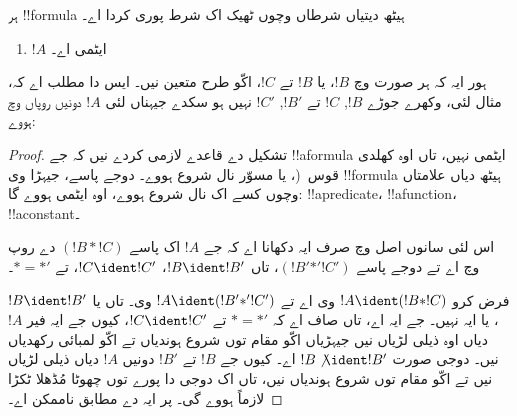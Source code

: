 \documentclass[../../../include/open-logic-section]{subfiles}
\begin{document}
\begin{prop}
ہر !!{formula} ہیٹھ دیتیاں شرطاں وچوں ٹھیک اک
شرط پوری کردا اے۔
\begin{enumerate}
\item $!A$ ایٹمی اے۔







\end{enumerate}
ہور ایہ کہ ہر صورت وچ $!B$، یا $!B$ تے $!C$،
اکّو طرح متعین نیں۔ ایس دا مطلب اے کہ، مثال لئی،
وکھرے جوڑے $!B$, $!C$ تے $!B'$, $!C'$ نہیں ہو
سکدے جیہناں لئی $!A$ دونیں روپاں وچ ہووے:
\end{prop}

\begin{proof}
تشکیل دے قاعدے لازمی کردے نیں کہ جے !!a{formula}
ایٹمی نہیں، تاں اوہ کھلدی قوس~(،
 یا مسوّر نال شروع ہووے۔
دوجے پاسے، جیہڑا وی !!{formula} ہیٹھ دیاں
علامتاں وچوں کسے اک نال شروع ہووے، اوہ ایٹمی
ہووے گا: !!a{predicate}، !!a{function}، !!a{constant}۔

اس لئی سانوں اصل وچ صرف ایہ دکھانا اے کہ جے $!A$
اک پاسے $(!B \ast
!C)$ دے روپ وچ اے تے دوجے پاسے $(!B' \mathbin{\ast'} !C')$،
تاں $!B \ident
!B'$، $!C \ident !C'$، تے $\ast = {\ast'}$۔

فرض کرو $!A \ident (!B \ast !C)$ وی اے تے $!A \ident (!B'
\mathbin{\ast'} !C')$ وی۔ تاں یا $!B \ident !B'$، یا ایہ
نہیں۔ جے ایہ اے، تاں صاف اے کہ $\ast = {\ast'}$ تے
$!C \ident !C'$، کیوں جے ایہ فیر $!A$ دیاں
اوہ ذیلی لڑیاں نیں جیہڑیاں اکّو مقام توں شروع ہوندیاں
تے اکّو لمبائی رکھدیاں نیں۔ دوجی صورت $!B \not\ident !B'$
اے۔ کیوں جے $!B$ تے
$!B'$ دونیں $!A$ دیاں ذیلی لڑیاں نیں تے اکّو مقام
توں شروع ہوندیاں نیں، تاں اک دوجی دا پورے توں
چھوٹا مُڈھلا ٹکڑا لازماً ہووے گی۔ پر ایہ
 دے مطابق ناممکن اے۔
\end{proof}
\end{document}

